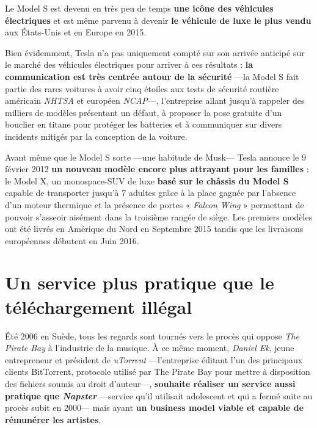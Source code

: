 \vspace{5mm}

Le Model S est devenu en très peu de temps \textbf{une icône des véhicules électriques} et est même parvenu à devenir \textbf{le véhicule de luxe le plus vendu} aux États-Unis\supercite{Tesla2015FullYearUpdate} et en Europe\supercite{ModelSLuxuryCarEurope} en 2015.

Bien évidemment, Tesla n'a pas uniquement compté sur son arrivée anticipé sur le marché des véhicules électriques pour arriver à ces résultats : \textbf{la communication est très centrée autour de la sécurité} ---la Model S fait partie des rares voitures à avoir cinq étoiles aux tests de sécurité routière américain \textit{NHTSA} et européen \textit{NCAP}\supercite{ModelSNCAP}---, l'entreprise allant jusqu'à rappeler des milliers de modèles présentant un défaut\supercite{ModelSPartialRecall}, à proposer la pose gratuite d'un bouclier en titane pour protéger les batteries\supercite{ModelSTitaniumShield} et à communiquer sur divers incidents mitigés par la conception de la voiture\supercite{ModelSFire}\supercite{ModelSAccident}.

\vspace{5mm}

Avant même que le Model S sorte ---une habitude de Musk--- Tesla annonce le 9 février 2012 \textbf{un nouveau modèle encore plus attrayant pour les familles} : le Model X, un monospace-SUV de luxe \textbf{basé sur le châssis du Model S} capable de transporter jusqu'à 7 adultes grâce à la place gagnée par l'absence d'un moteur thermique et la présence de portes « \textit{Falcon Wing} » permettant de pouvoir s'asseoir aisément dans la troisième rangée de siège. Les premiers modèles ont été livrés en Amérique du Nord en Septembre 2015 tandis que les livraisons européennes débutent en Juin 2016.

\section{Un service plus pratique que le téléchargement illégal}

Été 2006 en Suède, tous les regards sont tournés vers le procès qui oppose \textit{The Pirate Bay} à l'industrie de la musique. À ce même moment, \textit{Daniel Ek}, jeune entrepreneur et président de \textit{uTorrent} ---l'entreprise éditant l'un des principaux clients BitTorrent, protocole utilisé par The Pirate Bay pour mettre à disposition des fichiers soumis au droit d'auteur---, \textbf{souhaite réaliser un service aussi pratique que \textit{Napster}} ---service qu'il utilisait adolescent et qui a fermé suite au procès subit en 2000--- mais ayant \textbf{un business model viable et capable de rémunérer les artistes}. 


